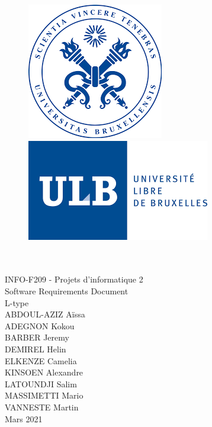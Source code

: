 \documentclass[a4paper,12pt]{article}
\begin{document}
    \begin{titlepage}

        \begin{center}
        
            \begin{figure}[H]
              \begin{minipage}[c]{.46\linewidth}
                    \centering
                    \includegraphics[scale = 0.3]{images/sceau_ulb.png}
                \end{minipage}
                \hfill%
                \begin{minipage}[c]{.46\linewidth}
                    \centering
                    \includegraphics[scale=0.5]{images/logo_ulb.png}
                \end{minipage}
            \end{figure}
        
            {\\[2 cm] \Huge\\INFO-F209 - Projets d'informatique 2 \\ Software Requirements Document \\ [1 cm]
            L-type\\[2 cm]}
            {ABDOUL-AZIZ Aïssa \\[0,2 cm] ADEGNON Kokou  \\[0,2 cm] BARBER Jeremy \\[0,2 cm] DEMIREL Helin \\[0,2 cm] ELKENZE Camelia  \\[0,2 cm] KINSOEN Alexandre  \\[0,2 cm] LATOUNDJI Salim  \\[0,2 cm] MASSIMETTI Mario  \\[0,2 cm] VANNESTE Martin  \\ [3 cm] Mars 2021}

        \end{center}

    \end{titlepage}
\end{document}
